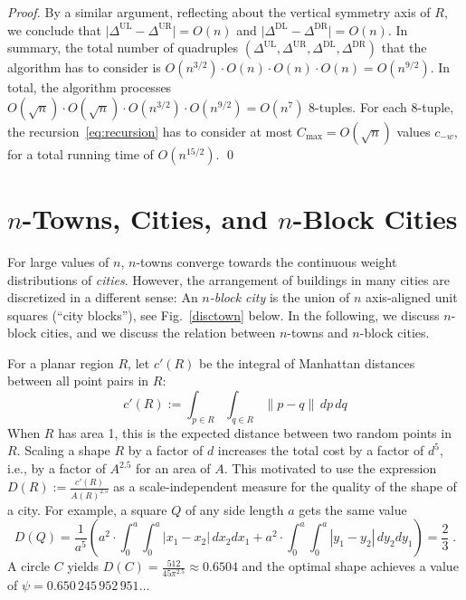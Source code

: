 \documentclass[preprint,authoryear,12pt]{elsarticle}
\newcommand{\abs}[1]{\lvert #1 \rvert}
\newcommand{\norm}[1]{\lVert #1 \rVert}
\begin{document}
\begin{proof}
By a similar argument, reflecting about
 the vertical symmetry axis of $R$, we conclude that
  $\abs{\Delta^\mathrm{UL}-\Delta^\mathrm{UR}}=O(n)$ and
$\abs{\Delta^\mathrm{DL}-\Delta^\mathrm{DR}}=O(n)$. In summary, the
total number of quadruples
  $(\Delta^\mathrm{UL},\Delta^\mathrm{UR},\Delta^\mathrm{DL},\Delta^\mathrm{DR})$
that the algorithm has to consider is $O(n^{3/2})\cdot O(n)\cdot
O(n)\cdot O(n)=O(n^{9/2})$. In total, the algorithm processes
$O(\sqrt n)\cdot O(\sqrt n)\cdot O(n^{3/2})\cdot O(n^{9/2})=O(n^7)$
8-tuples. For each 8-tuple, the recursion~\eqref{eq:recursion} has
to consider at most $C_{\max}= O(\sqrt n)$ values $c_{-w}$, for a
total running time of $O(n^{15/2})$.  \qed
\end{proof}

\section{\boldmath $n$-Towns, Cities, and $n$-Block Cities}\label{sec:townscitiesblockcities}
 For large values of $n$,
 $n$-towns converge
towards the continuous weight distributions of {\em cities}.
However, the arrangement of buildings in many cities are discretized
in a different sense: An {\em{$n$-block city}} is the
union of $n$ axis-aligned unit squares (``city blocks''),
see Fig.~\ref{disctown} below. In the following,
we discuss $n$-block cities, and
we discuss the relation between $n$-towns and $n$-block
cities.








For a planar region $R$, let $c'(R)$ be the integral of Manhattan distances between all point pairs in $R$:
$$c'(R) :=
\int_{p\in R}
\int_{q\in R} \norm{p-q}\, dp\, dq
$$
  When $R$ has
area 1, this is the expected distance between two random points
in~$R$.
Scaling a shape $R$ by a factor of $d$ increases the total cost by a
factor of $d^5$, i.e., by a factor of $A^{2.5}$ for an area of $A$.
This motivated \cite{Bender03whatis} to use the expression
$D(R):=\frac{c'(R)}{A(R)^{2.5}}$ as a scale-independent measure for the
quality of the shape of a city. For example, a square $Q$ of any side length $a$ gets the same
value
\begin{equation*}
D(Q)=
\frac{1}{a^{5}} \left(
a^2\cdot\!
 \int_0^a\!\! \int_0^a\! |x_1-x_2|\, dx_2 dx_1+
a^2\cdot\!
 \int_0^a\!\! \int_0^a\! |y_1-y_2|\, dy_2 dy_1\right) =
\frac{2}{3} \; .
\end{equation*}
A circle $C$ yields $D(C)=\frac{512}{45\pi^{2.5}}\approx 0.6504$ and
the optimal shape achieves a value of $\psi=0.650\,245\,952\,951\ldots$
\end{document}
